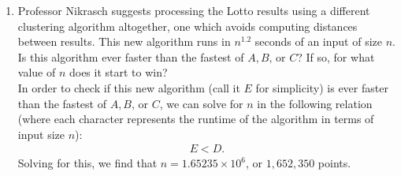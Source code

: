 \documentclass[11pt]{article}
\begin{document}
\begin{enumerate}
\begin{enumerate}
\\
\item Professor Nikrasch suggests processing the Lotto results using a different clustering algorithm
altogether, one which avoids computing distances between results. This new algorithm runs in $n^{1.2}$ seconds of an input of size $n$. Is this algorithm ever faster than the fastest of $\mathit{A}, \mathit{B} \textrm{, or } \mathit{C}$?  If so, for what value of $n$ does it start to win?
\\
In order to check if this new algorithm (call it $\mathit{E}$ for simplicity) is ever faster than the fastest of  $\mathit{A}, \mathit{B} \textrm{, or } \mathit{C}$, we can solve for $n$ in the following relation (where each character represents the runtime of the algorithm in terms of input size $n$):
\begin{align*}
E < D.
\end{align*}
Solving for this, we find that $n = 1.65235 \times 10^6$, or $1,652,350$ points.
\end{enumerate}
\end{enumerate}
\end{document}
